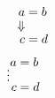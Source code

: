 \documentclass{article}
\begin{document}
\begin{alignat}{2}
&& a &= b \\ \ArrowBetweenLines*[\Downarrow]
&& c &= d
\end{alignat}
\begin{align*} a &= b \\ \shortvdotswithin*{=}
c &= d \end{align*}
\end{document}

